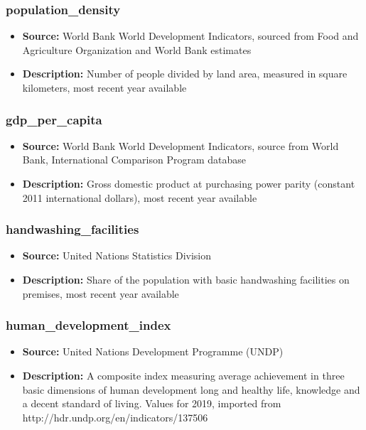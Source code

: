 \documentclass{article}
\begin{document}
\begin{multicols}{2}
\subsubsection{population\_density}
\begin{itemize}
    \item \textbf{Source:} World Bank World Development Indicators, sourced from Food and Agriculture Organization and World Bank estimates
    \item \textbf{Description:} Number of people divided by land area, measured in square kilometers, most recent year available
\end{itemize}

\subsubsection{gdp\_per\_capita}
\begin{itemize}
    \item \textbf{Source:} World Bank World Development Indicators, source from World Bank, International Comparison Program database
    \item \textbf{Description:} Gross domestic product at purchasing power parity (constant 2011 international dollars), most recent year available
\end{itemize}

\subsubsection{handwashing\_facilities}
\begin{itemize}
    \item \textbf{Source:} United Nations Statistics Division
    \item \textbf{Description:} Share of the population with basic handwashing facilities on premises, most recent year available
\end{itemize}

\subsubsection{human\_development\_index}
\begin{itemize}
    \item \textbf{Source:} United Nations Development Programme (UNDP)
    \item \textbf{Description:} A composite index measuring average achievement in three basic dimensions of human development long and healthy life, knowledge and a decent standard of living. Values for 2019, imported from http://hdr.undp.org/en/indicators/137506
\end{itemize}


\end{multicols}
\end{document}

